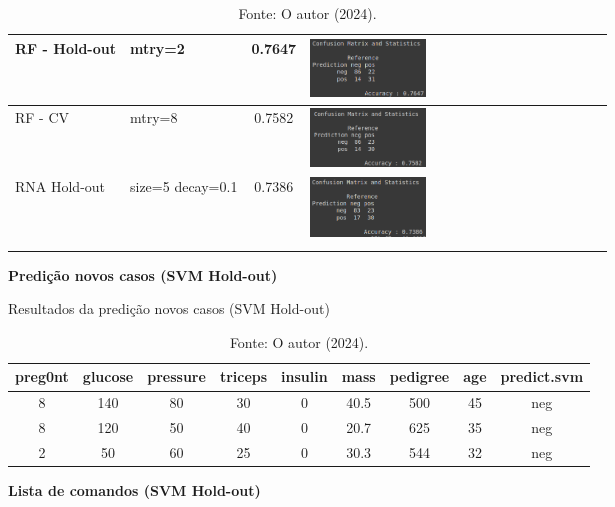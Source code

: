 \begin{longtable}{|>{\centering\arraybackslash}p{3cm}|>{\centering\arraybackslash}m{2.5cm}|c|m{7cm}|}
\hline
RF - Hold-out & mtry=2 & 0.7647 & \includegraphics[width=0.4\textwidth]{apendices/fig/8_IAA008_12.png} \\
\hline
RF - CV  & mtry=8 & 0.7582 & \includegraphics[width=0.4\textwidth]{apendices/fig/8_IAA008_13.png} \\
\hline
RNA Hold-out  & size=5 decay=0.1 & 0.7386 & \includegraphics[width=0.4\textwidth]{apendices/fig/8_IAA008_14.png} \\
\hline
\caption*{Fonte: O autor (2024).}
\end{longtable}


\begin{center}
    \textbf{Predição novos casos (SVM Hold-out)}
\end{center}

\begin{table}[H]
\centering
\caption{Resultados da predição novos casos (SVM Hold-out)}
\begin{tabular}{|c|c|c|c|c|c|c|c|c|}
\hline
preg0nt & glucose & pressure & triceps & insulin & mass & pedigree & age & predict.svm \\
\hline
8 & 140 & 80 & 30 & 0 & 40.5 & 500 & 45 & neg \\
\hline
8 & 120 & 50 & 40 & 0 & 20.7 & 625 & 35 & neg \\
\hline
2 & 50  & 60 & 25 & 0 & 30.3 & 544 & 32 & neg \\
\hline
\end{tabular}
\caption*{Fonte: O autor (2024).}
\end{table}

\begin{center}
    \textbf{Lista de comandos (SVM Hold-out)}
\end{center}

